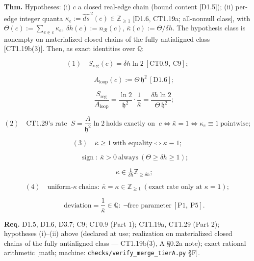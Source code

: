 \begin{theorem}\label{tag:CT1-29a}
\textbf{Thm.} Hypotheses: (i) $c$ a closed real-edge chain (bound content [D1.5]); (ii) per-edge integer quanta $\kappa_e:=\widehat{ds}^{\,2}(e)\in\mathbb Z_{\ge1}$ [D1.6, CT1.19a; all-nonnull class], with $\Theta(c):=\sum_{e\in c}\kappa_e$, $\delta h(c):=n_{\mathcal R}(c)$, $\bar\kappa(c):=\Theta/\delta h$. The hypothesis class is nonempty on materialized closed chains of the fully antialigned class [CT1.19b(3)]. Then, as exact identities over $\mathbb Q$:

\[
(1)\quad S_{\mathrm{reg}}(c)=\delta h\ln2\ [\mathrm{CT0.9},\ \mathrm{C9}];
\]

\[
\qquad A_{\mathrm{loop}}(c):=\Theta\,\mathfrak h^2\ [\mathrm{D1.6}];
\]

\[
\qquad \frac{S_{\mathrm{reg}}}{A_{\mathrm{loop}}}=\frac{\ln2}{\mathfrak h^2}\cdot\frac1{\bar\kappa}=\frac{\delta h\ln2}{\Theta\,\mathfrak h^2};
\]

\[
(2)\quad \text{CT1.29's rate }\ S=\frac{A}{\mathfrak h^2}\ln2\ \text{holds exactly on }\ c\iff\bar\kappa=1\iff\kappa_e\equiv1\ \text{pointwise};
\]

\[
(3)\quad \bar\kappa\ge1\ \text{with equality}\iff\kappa\equiv1;
\]

\[
\qquad \operatorname{sign}:\ \bar\kappa>0\ \text{always}\ (\Theta\ge\delta h\ge1);
\]

\[
\qquad \bar\kappa\in\tfrac1{\delta h}\mathbb Z_{\ge\delta h};
\]

\[
(4)\quad \text{uniform-}\kappa\ \text{chains}:\ \bar\kappa=\kappa\in\mathbb Z_{\ge1}\ (\text{exact rate only at }\kappa=1);
\]

\[
\qquad \text{deviation}=\frac1{\bar\kappa}\in\mathbb Q:\ \neg\text{free parameter}\ [\mathrm{P1},\ \mathrm{P5}].
\]

\textbf{Req.} D1.5, D1.6, D3.7; C9; CT0.9 (Part 1); CT1.19a, CT1.29 (Part 2); hypotheses (i)–(ii) above (declared at use; realization on materialized closed chains of the fully antialigned class — CT1.19b(3), A §0.2a note); exact rational arithmetic [math; machine: \texttt{checks/\allowbreak{}verify\_\allowbreak{}merge\_\allowbreak{}tierA.py} §F].


\end{theorem}
